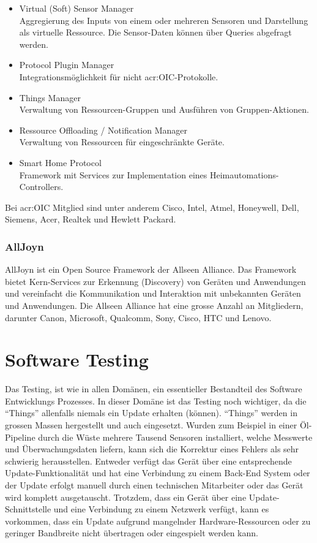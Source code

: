 \begin{itemize}
\item Virtual (Soft) Sensor Manager \\
Aggregierung des Inputs von einem oder mehreren Sensoren und Darstellung als virtuelle Ressource. Die Sensor-Daten können über Queries abgefragt werden.
\item Protocol Plugin Manager\\
Integrationsmöglichkeit für nicht \gls{acr:OIC}-Protokolle.
\item Things Manager\\
Verwaltung von Ressourcen-Gruppen und Ausführen von Gruppen-Aktionen.
\item Ressource Offloading / Notification Manager\\
Verwaltung von Ressourcen für eingeschränkte Geräte.
\item Smart Home Protocol\\
Framework mit Services zur Implementation eines Heimautomations-Controllers.
\end{itemize}

Bei \gls{acr:OIC} Mitglied sind unter anderem Cisco, Intel, Atmel, Honeywell, Dell, Siemens, Acer, Realtek und Hewlett Packard.

\subsubsection{AllJoyn}
AllJoyn ist ein Open Source Framework  der Allseen Alliance. Das Framework bietet Kern-Services zur Erkennung (Discovery) von Geräten und Anwendungen und vereinfacht die Kommunikation und Interaktion mit unbekannten Geräten und Anwendungen. Die Allseen Alliance hat eine grosse Anzahl an Mitgliedern, darunter Canon, Microsoft, Qualcomm, Sony, Cisco, HTC und Lenovo.


\section{Software Testing}
Das Testing, ist wie in allen Domänen, ein essentieller Bestandteil des Software Entwicklungs Prozesses. In dieser Domäne ist das Testing noch wichtiger, da die "`Things"' allenfalls niemals ein Update erhalten (können). "`Things"' werden in grossen Massen hergestellt und auch eingesetzt. Wurden zum Beispiel in einer Öl-Pipeline durch die Wüste mehrere Tausend Sensoren installiert, welche Messwerte und Überwachungsdaten liefern, kann sich die Korrektur eines Fehlers als sehr schwierig herausstellen. Entweder verfügt das Gerät über eine entsprechende Update-Funktionalität und hat eine Verbindung zu einem Back-End System oder der Update erfolgt manuell durch einen technischen Mitarbeiter oder das Gerät wird komplett ausgetauscht. Trotzdem, dass ein Gerät über eine Update-Schnittstelle und eine Verbindung zu einem Netzwerk verfügt, kann es vorkommen, dass ein Update aufgrund mangelnder Hardware-Ressourcen oder zu geringer Bandbreite nicht übertragen oder eingespielt werden kann.

